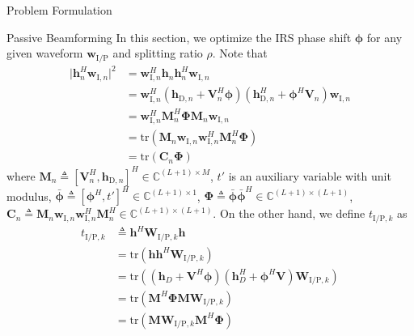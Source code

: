 \documentclass[journal]{IEEEtran}
\begin{document}
\begin{section}{Problem Formulation}
		\begin{subsection}{Passive Beamforming}
			In this section, we optimize the IRS phase shift $\boldsymbol{\phi}$ for any given waveform $\boldsymbol{w}_{\mathrm{I/P}}$ and splitting ratio $\rho$. Note that
			\begin{align}
				\lvert \boldsymbol{h}_{n}^H\boldsymbol{w}_{\mathrm{I},n} \rvert^2
				& = \boldsymbol{w}_{\mathrm{I},n}^H\boldsymbol{h}_n\boldsymbol{h}_n^H\boldsymbol{w}_{\mathrm{I},n}\nonumber\\
				& = \boldsymbol{w}_{\mathrm{I},n}^H(\boldsymbol{h}_{\mathrm{D},n}+\boldsymbol{V}_n^H\boldsymbol{\phi})(\boldsymbol{h}_{\mathrm{D},n}^H+\boldsymbol{\phi}^H\boldsymbol{V}_n)\boldsymbol{w}_{\mathrm{I},n}\nonumber\\
				& = \boldsymbol{w}_{\mathrm{I},n}^H\boldsymbol{M}_n^H\boldsymbol{\Phi}\boldsymbol{M}_n\boldsymbol{w}_{\mathrm{I},n}\nonumber\\
				& = \mathrm{tr}(\boldsymbol{M}_n\boldsymbol{w}_{\mathrm{I},n}\boldsymbol{w}_{\mathrm{I},n}^H\boldsymbol{M}_n^H\boldsymbol{\Phi})\nonumber\\
				& = \mathrm{tr}(\boldsymbol{C}_n\boldsymbol{\Phi})
			\end{align}
			where $\boldsymbol{M}_n \triangleq [\boldsymbol{V}_n^H, \boldsymbol{h}_{\mathrm{D},n}]^H \in \mathbb{C}^{(L+1) \times M}$, $t'$ is an auxiliary variable with unit modulus, $\bar{\boldsymbol{\phi}} \triangleq [\boldsymbol{\phi}^H, t']^H \in \mathbb{C}^{(L+1) \times 1}$, $\boldsymbol{\Phi} \triangleq \bar{\boldsymbol{\phi}}\bar{\boldsymbol{\phi}}^H \in \mathbb{C}^{(L+1) \times (L+1)}$, $\boldsymbol{C}_n \triangleq \boldsymbol{M}_n\boldsymbol{w}_{\mathrm{I},n}\boldsymbol{w}_{\mathrm{I},n}^H\boldsymbol{M}_n^H \in \mathbb{C}^{(L+1)\times(L+1)}$. On the other hand, we define $t_{\mathrm{I/P},k}$ as
			\begin{align}
				t_{\mathrm{I/P},k}
				& \triangleq \boldsymbol{h}^H\boldsymbol{W}_{\mathrm{I/P},k}\boldsymbol{h}\nonumber\\
				& = \mathrm{tr}(\boldsymbol{h}\boldsymbol{h}^H\boldsymbol{W}_{\mathrm{I/P},k})\nonumber\\
				& = \mathrm{tr}\left((\boldsymbol{h}_{D}+\boldsymbol{V}^H\boldsymbol{\phi})(\boldsymbol{h}_{D}^H+\boldsymbol{\phi}^H\boldsymbol{V})\boldsymbol{W}_{\mathrm{I/P},k}\right)\nonumber\\
				& = \mathrm{tr}(\boldsymbol{M}^H\boldsymbol{\Phi}\boldsymbol{M}\boldsymbol{W}_{\mathrm{I/P},k})\nonumber\\
				& = \mathrm{tr}(\boldsymbol{M}\boldsymbol{W}_{\mathrm{I/P},k}\boldsymbol{M}^H\boldsymbol{\Phi})\nonumber\\

\end{align}
\end{subsection}
\end{section}
\end{document}
